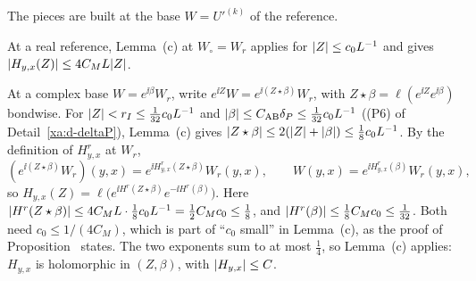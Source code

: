 \begin{detail}\label{xa:d-gf}
The pieces are built at the base $W=U'^{(k)}$ of the reference.
\begin{step}
At a real reference, Lemma~(c) at $W_\circ=W_r$ applies for $\lvert Z\rvert\le c_0L^{-1}$ and gives $\lvert H_{y,x}(Z)\rvert\le4C_ML\lvert Z\rvert$.

At a complex base $W=e^{\ii\beta}W_r$, write $e^{\ii Z}W=e^{\ii(Z\star\beta)}W_r$, with $Z\star\beta=\ell(e^{\ii Z}e^{\ii\beta})$ bondwise. For $\lvert Z\rvert<r_I\le\frac1{32}c_0L^{-1}$ and $\lvert\beta\rvert\le C_{\rm AB}\delta_P\le\frac1{32}c_0L^{-1}$ ((P6) of Detail~\ref{xa:d-deltaP}), Lemma~(c) gives $\lvert Z\star\beta\rvert\le2(\lvert Z\rvert+\lvert\beta\rvert)\le\frac18c_0L^{-1}$. By the definition of $H^r_{y,x}$ at $W_r$,
\[
(e^{\ii(Z\star\beta)}W_r)(y,x)=e^{\ii H^r_{y,x}(Z\star\beta)}W_r(y,x),\qquad W(y,x)=e^{\ii H^r_{y,x}(\beta)}W_r(y,x),
\]
so $H_{y,x}(Z)=\ell\big(e^{\ii H^r(Z\star\beta)}e^{-\ii H^r(\beta)}\big)$. Here $\lvert H^r(Z\star\beta)\rvert\le4C_ML\cdot\frac18c_0L^{-1}=\frac12C_Mc_0\le\frac18$, and $\lvert H^r(\beta)\rvert\le\frac18C_Mc_0\le\frac1{32}$. Both need $c_0\le1/(4C_M)$, which is part of ``$c_0$ small'' in Lemma~(c), as the proof of Proposition~ states. The two exponents sum to at most $\frac14$, so Lemma~(c) applies: $H_{y,x}$ is holomorphic in $(Z,\beta)$, with $\lvert H_{y,x}\rvert\le C$.
\end{step}


\end{detail}
